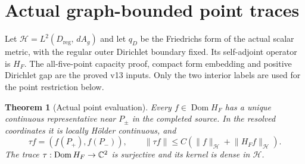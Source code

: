 \documentclass[11pt]{article}
\newtheorem{theorem}{Theorem}[section]
\theoremstyle{remark}\newtheorem{remark}[theorem]{Remark}
\newcommand{\Dom}{\operatorname{Dom}}\newcommand{\dd}{\,d}
\newcommand{\norm}[1]{\lVert#1\rVert}
\begin{document}
\section{Actual graph-bounded point traces}\label{sec:trace}
Let $\mathcal H=L^2(D_{\mathrm{reg}},\dd A_g)$ and let $q_D$ be the
Friedrichs form of the actual scalar metric, with the regular outer Dirichlet
boundary fixed. Its self-adjoint operator is $H_F$.
The all-five-point capacity proof, compact form embedding and positive
Dirichlet gap are the proved v13 inputs. Only the two interior labels are
used for the point restriction below.

\begin{theorem}[Actual point evaluation]\label{thm:trace}
Every $f\in\Dom H_F$ has a unique continuous representative near $P_\pm$
in the completed source. In the resolved coordinates it is locally H\"older
continuous, and
\[
 \tau f=(f(P_+),f(P_-)),\qquad
 \norm{\tau f}\leq C(\norm f_{\mathcal H}+\norm{H_Ff}_{\mathcal H}).
\]
The trace $\tau:\Dom H_F\to\C^2$ is surjective and its kernel is dense in
$\mathcal H$.
\end{theorem}
\end{document}
